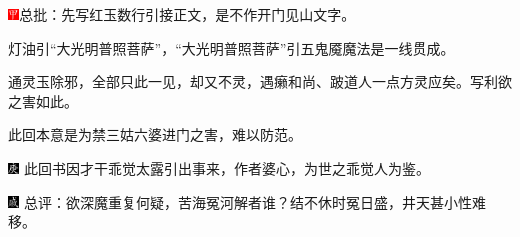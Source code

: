\includegraphics[width=3mm]{../Images/00002}{总批：先写红玉数行引接正文，是不作开门见山文字。}

{灯油引“大光明普照菩萨”，“大光明普照菩萨”引五鬼魇魔法是一线贯成。}

{通灵玉除邪，全部只此一见，却又不灵，遇癞和尚、跛道人一点方灵应矣。写利欲之害如此。}

{此回本意是为禁三姑六婆进门之害，难以防范。}

{{\includegraphics[width=3mm]{../Images/00004} \kaishu 此回书因才干乖觉太露引出事来，作者婆心，为世之乖觉人为鉴。}}

{\includegraphics[width=3mm]{../Images/00005}  \kaishu 总评：欲深魔重复何疑，苦海冤河解者谁？结不休时冤日盛，井天甚小性难移。}